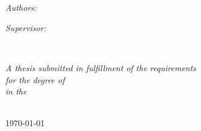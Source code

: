 \documentclass[
11pt, %
english, %
singlespacing, %
headsepline, %
]{MastersDoctoralThesis} %
\author{Jahangir \textsc{Iqbal}} %
\begin{document}
\frontmatter %
\pagestyle{plain} %

\begin{titlepage}
\begin{center}

\vspace*{.06\textheight}
{\scshape\LARGE \univname\par}\vspace{1.5cm} %

\HRule \\[0.4cm] %
{\huge \bfseries \ttitle\par}\vspace{0.4cm} %
\HRule \\[1.5cm] %
 
\begin{minipage}[t]{0.4\textwidth}
\begin{flushleft} \large
\emph{Authors:}\\
\href{http://www.johnnysmith.com}{\authorname} %
\end{flushleft}
\end{minipage}
\begin{minipage}[t]{0.4\textwidth}
\begin{flushright} \large
\emph{Supervisor:} \\
\href{http://www.jamessmith.com}{\supname} %
\end{flushright}
\end{minipage}\\[3cm]
 
\vfill

\large \textit{A thesis submitted in fulfillment of the requirements\\ for the degree of \degreename}\\[0.3cm] %
\textit{in the}\\[0.4cm]
\deptname\\[2cm] %
 
\vfill

{\large \today}\\[4cm] %
\vfill
\end{center}
\end{titlepage}
\end{document}
